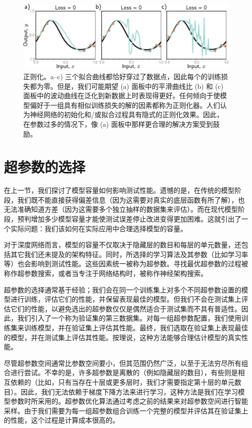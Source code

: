\documentclass[lang=cn,newtx,10pt,scheme=chinese]{elegantbook}
\begin{document}
\begin{figure}[ht!]
\centering
\includegraphics[width=0.7\linewidth]{PDFFigures/UDLChap8PDF/PerfSmoothness2.pdf}
\caption{正则化。a–c) 三个拟合曲线都恰好穿过了数据点，因此每个的训练损失都为零。但是，我们可能期望 (a) 面板中的平滑曲线比 (b) 和 (c) 面板中的波动曲线在泛化到新数据上时表现得更好。任何倾向于使模型偏好于一组具有相似训练损失的解的因素都称为正则化器。人们认为神经网络的初始化和/或拟合过程具有隐式的正则化效果。因此，在参数过多的情况下，像 (a) 面板中那样更合理的解决方案受到鼓励。}
\end{figure}

\section{超参数的选择}
在上一节，我们探讨了模型容量如何影响测试性能。遗憾的是，在传统的模型阶段，我们既不能直接获得偏差信息（因为这需要对真实的底层函数有所了解），也无法准确知道方差（因为这需要多个独立抽样的数据集来评估）。而在现代模型阶段，预判增加多少模型容量才能使测试误差停止改进变得更加困难。这就引出了一个实际问题：我们该如何在实际应用中合理选择模型的容量。

对于深度网络而言，模型的容量不仅取决于隐藏层的数目和每层的单元数量，还包括其它我们还未提及的架构特征。同时，所选择的学习算法及其参数（比如学习率等）也会影响到测试性能。这些因素统一被称为超参数。寻找最优超参数的过程被称作超参数搜索，或者当专注于网络结构时，被称作神经架构搜索。

超参数的选择通常基于经验；我们会在同一个训练集上对多个不同超参数设置的模型进行训练，评估它们的性能，并保留表现最佳的模型。但我们不会在测试集上评估它们的性能，以避免选出的超参数仅仅是偶然适合于测试集而不具有普适性。因此，我们引入了一个称为验证集的第三数据集。对每一组超参数配置，我们使用训练集来训练模型，并在验证集上评估其性能。最终，我们选取在验证集上表现最佳的模型，并在测试集上评估其性能。按理说，这种方法能够合理估计模型的真实性能。

尽管超参数空间通常比参数空间要小，但其范围仍然广泛，以至于无法穷尽所有组合进行尝试。不幸的是，许多超参数是离散的（例如隐藏层的数目），有些则是相互依赖的（比如，只有当存在十层或更多层时，我们才需要指定第十层的单元数目）。因此，我们无法依赖于梯度下降方法来进行学习，这种方法是我们在学习模型参数时所采用的。超参数优化算法通过考虑之前的结果来对超参数空间进行智能采样。由于我们需要为每一组超参数组合训练一个完整的模型并评估其在验证集上的性能，这个过程是计算成本很高的。
\end{document}
